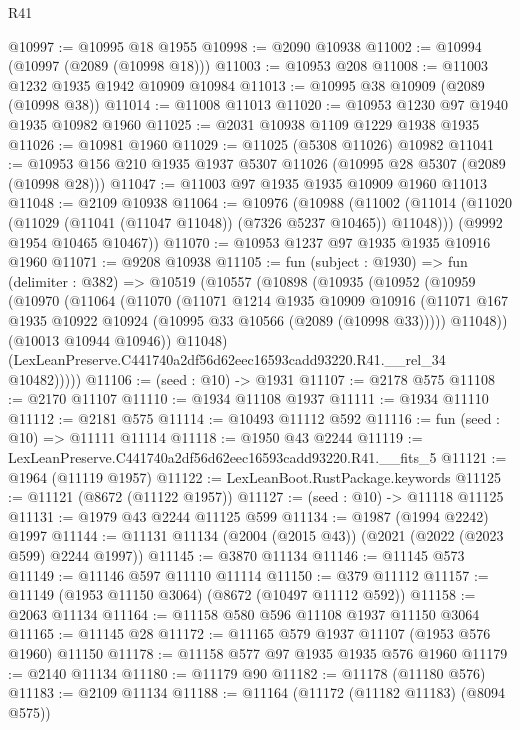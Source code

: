 \begin{lexlean}{R41}
\begin{coremodule}
@10997 := @10995 @18 @1955
@10998 := @2090 @10938
@11002 := @10994 (@10997 (@2089 (@10998 @18)))
@11003 := @10953 @208
@11008 := @11003 @1232 @1935 @1942 @10909 @10984
@11013 := @10995 @38 @10909 (@2089 (@10998 @38))
@11014 := @11008 @11013
@11020 := @10953 @1230 @97 @1940 @1935 @10982 @1960
@11025 := @2031 @10938 @1109 @1229 @1938 @1935
@11026 := @10981 @1960
@11029 := @11025 (@5308 @11026) @10982
@11041 := @10953 @156 @210 @1935 @1937 @5307 @11026 (@10995 @28 @5307 (@2089 (@10998 @28)))
@11047 := @11003 @97 @1935 @1935 @10909 @1960 @11013
@11048 := @2109 @10938
@11064 := @10976
    (@10988
      (@11002 (@11014 (@11020 (@11029 (@11041 (@11047 @11048)) (@7326 @5237 @10465)) @11048)))
      (@9992 @1954 @10465 @10467))
@11070 := @10953 @1237 @97 @1935 @1935 @10916 @1960
@11071 := @9208 @10938
@11105 := fun (subject : @1930) =>
  fun (delimiter : @382) =>
  @10519
    (@10557
      (@10898
        (@10935
          (@10952
            (@10959
              (@10970
                (@11064
                  (@11070
                    (@11071
                      @1214
                      @1935
                      @10909
                      @10916
                      (@11071 @167 @1935 @10922 @10924 (@10995 @33 @10566 (@2089 (@10998 @33)))))
                    @11048))
                (@10013 @10944 @10946))
              @11048)
            (LexLeanPreserve.C441740a2df56d62eec16593cadd93220.R41.__rel_34 @10482)))))
@11106 := (seed : @10) -> @1931
@11107 := @2178 @575
@11108 := @2170 @11107
@11110 := @1934 @11108 @1937
@11111 := @1934 @11110
@11112 := @2181 @575
@11114 := @10493 @11112 @592
@11116 := fun (seed : @10) => @11111 @11114
@11118 := @1950 @43 @2244
@11119 := LexLeanPreserve.C441740a2df56d62eec16593cadd93220.R41.__fits_5
@11121 := @1964 (@11119 @1957)
@11122 := LexLeanBoot.RustPackage.keywords
@11125 := @11121 (@8672 (@11122 @1957))
@11127 := (seed : @10) -> @11118 @11125
@11131 := @1979 @43 @2244 @11125 @599
@11134 := @1987 (@1994 @2242) @1997
@11144 := @11131 @11134 (@2004 (@2015 @43)) (@2021 (@2022 (@2023 @599) @2244 @1997))
@11145 := @3870 @11134
@11146 := @11145 @573
@11149 := @11146 @597 @11110 @11114
@11150 := @379 @11112
@11157 := @11149 (@1953 @11150 @3064) (@8672 (@10497 @11112 @592))
@11158 := @2063 @11134
@11164 := @11158 @580 @596 @11108 @1937 @11150 @3064
@11165 := @11145 @28
@11172 := @11165 @579 @1937 @11107 (@1953 @576 @1960) @11150
@11178 := @11158 @577 @97 @1935 @1935 @576 @1960
@11179 := @2140 @11134
@11180 := @11179 @90
@11182 := @11178 (@11180 @576)
@11183 := @2109 @11134
@11188 := @11164 (@11172 (@11182 @11183) (@8094 @575))

\end{coremodule}
\end{lexlean}
